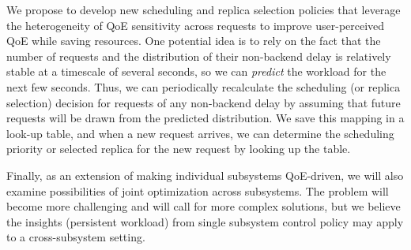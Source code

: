 

We propose to develop new scheduling and replica selection policies that leverage the heterogeneity of QoE sensitivity across requests to improve user-perceived QoE while saving resources. 
One potential idea is to rely on the fact that the number of requests and the distribution of their non-backend delay is relatively stable at a timescale of several seconds, so we can {\em predict} the workload for the next few seconds.
Thus, we can periodically recalculate the scheduling (or replica selection) decision for requests of any non-backend delay by assuming that future requests will be drawn from the predicted distribution.
We save this mapping in a look-up table, and when a new request arrives, we can determine the scheduling priority or selected replica for the new request by looking up the table.

Finally, as an extension of making individual subsystems QoE-driven, we will also examine possibilities of joint optimization across subsystems. The problem will become more challenging and will call for more complex solutions, but we believe the insights (\eg persistent workload) from single subsystem control policy may apply to a cross-subsystem setting.



















































